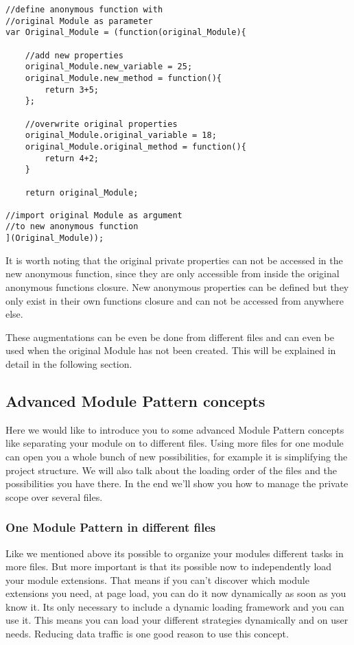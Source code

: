 \documentclass{bioinfo}
\begin{document}
\begin{lstlisting}
//define anonymous function with
//original Module as parameter
var Original_Module = (function(original_Module){

	//add new properties
	original_Module.new_variable = 25;
	original_Module.new_method = function(){
		return 3+5;
	};

	//overwrite original properties
	original_Module.original_variable = 18;
	original_Module.original_method = function(){
		return 4+2;
	}

	return original_Module;

//import original Module as argument
//to new anonymous function
](Original_Module));
\end{lstlisting}



It is worth noting that the original private properties can not be accessed in the new anonymous function, since they are only accessible from inside the original anonymous functions closure. New anonymous properties can be defined but they only exist in their own functions closure and can not be accessed from anywhere else.\vspace{\baselineskip}

These augmentations can be even be done from different files and can even be used when the original Module has not been created. This will be explained in detail in the following section.







\subsection{Advanced Module Pattern concepts}
Here we would like to introduce you to some advanced Module Pattern concepts like separating your module on to different files.
Using more files for one module can open you a whole bunch of new possibilities, for example it is simplifying the project structure.
We will also talk about the loading order of the files and the possibilities you have there.
In the end we'll show you how to manage the private scope over several files.

\subsubsection{One Module Pattern in different files}
Like we mentioned above its possible to organize your modules different tasks in more files.
But more important is that its possible now to independently load your module
extensions. That means if you can't discover which module extensions you need, at page load,
you can do it now dynamically as soon as you know it. Its only necessary to
include a dynamic loading framework and you can use it. This means you can load your different
strategies dynamically and on user needs. Reducing data traffic is one good reason to use this
concept.
\end{document}
